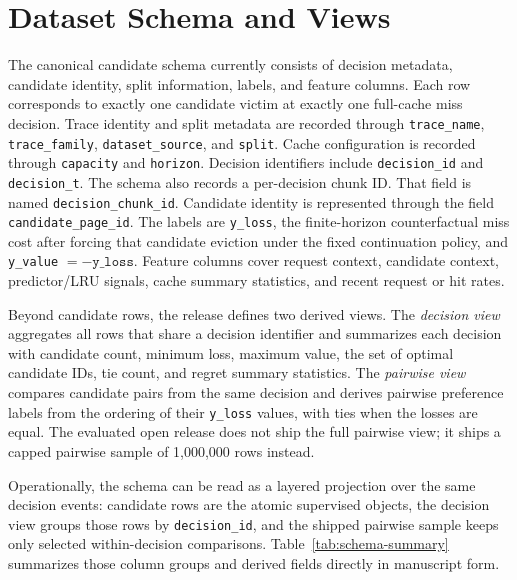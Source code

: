 \section{Dataset Schema and Views}
\label{sec:schema-views}

The canonical candidate schema currently consists of decision metadata, candidate identity, split information, labels, and feature columns. Each row corresponds to exactly one candidate victim at exactly one full-cache miss decision. Trace identity and split metadata are recorded through \texttt{trace\_name}, \texttt{trace\_family}, \texttt{dataset\_source}, and \texttt{split}. Cache configuration is recorded through \texttt{capacity} and \texttt{horizon}. Decision identifiers include \texttt{decision\_id} and \texttt{decision\_t}. The schema also records a per-decision chunk ID. That field is named \texttt{decision\_chunk\_id}. Candidate identity is represented through the field \texttt{candidate\_page\_id}. The labels are \texttt{y\_loss}, the finite-horizon counterfactual miss cost after forcing that candidate eviction under the fixed continuation policy, and \texttt{y\_value} $= -\texttt{y\_loss}$. Feature columns cover request context, candidate context, predictor/LRU signals, cache summary statistics, and recent request or hit rates.

Beyond candidate rows, the release defines two derived views. The \emph{decision view} aggregates all rows that share a decision identifier and summarizes each decision with candidate count, minimum loss, maximum value, the set of optimal candidate IDs, tie count, and regret summary statistics. The \emph{pairwise view} compares candidate pairs from the same decision and derives pairwise preference labels from the ordering of their \texttt{y\_loss} values, with ties when the losses are equal. The evaluated open release does not ship the full pairwise view; it ships a capped pairwise sample of 1,000,000 rows instead.

Operationally, the schema can be read as a layered projection over the same decision events: candidate rows are the atomic supervised objects, the decision view groups those rows by \texttt{decision\_id}, and the shipped pairwise sample keeps only selected within-decision comparisons. Table~\ref{tab:schema-summary} summarizes those column groups and derived fields directly in manuscript form.

